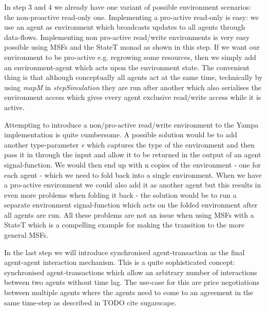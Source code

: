 In step 3 and 4 we already have one variant of possible environment scenarios: the non-proactive read-only one. Implementing a pro-active read-only is easy: we use an agent as environment which broadcasts updates to all agents through data-flows. Implementing non pro-active read/write environments is very easy possible using MSFs and the StateT monad as shown in this step. If we want our environment to be pro-active e.g. regrowing some resources, then we simply add an environment-agent which acts upon the environment state. The convenient thing is that although conceptually all agents act at the same time, technically by using \textit{mapM} in \textit{stepSimulation} they are run after another which also serialises the environment access which gives every agent exclusive read/write access while it is active.

Attempting to introduce a non/pro-active read/write environment to the Yampa implementation is quite cumbersome. A possible solution would be to add another type-parameter \textit{e} which captures the type of the environment and then pass it in through the input and allow it to be returned in the output of an agent signal-function. We would then end up with n copies of the environment - one for each agent - which we need to fold back into a single environment. When we have a pro-active environment we could also add it as another agent but this results in even more problems when folding it back - the solution would be to run a separate environment signal-function which acts on the folded environment after all agents are run. All these problems are not an issue when using MSFs with a StateT which is a compelling example for making the transition to the more general MSFs.

In the last step we will introduce synchronised agent-transaction as the final agent-agent interaction mechanism. This is a quite sophisticated concept: synchronised agent-transactions which allow an arbitrary number of interactions between two agents without time lag. The use-case for this are price negotiations between multiple agents where the agents need to come to an agreement in the same time-step as described in TODO cite sugarscape.